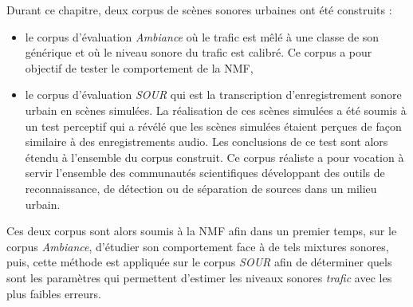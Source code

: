 Durant ce chapitre, deux corpus de scènes sonores urbaines ont été construits :
\begin{itemize}
\item le corpus d'évaluation \textit{Ambiance} où le trafic est mêlé à une classe de son générique et où le niveau sonore du trafic est calibré.  Ce corpus a pour objectif de tester le comportement de la NMF,
\item le corpus d'évaluation \textit{SOUR} qui est la transcription d'enregistrement sonore urbain en scènes simulées. La réalisation de ces scènes simulées a été soumis à un test perceptif qui a révélé que les scènes simulées étaient perçues de façon similaire à des enregistrements audio. Les conclusions de ce test sont alors étendu à l'ensemble du corpus construit. Ce corpus réaliste a pour vocation à servir l'ensemble des communautés scientifiques développant des outils de reconnaissance, de détection ou de séparation de sources dans un milieu urbain. \\
\end{itemize}

Ces deux corpus sont alors soumis à la NMF afin dans un premier temps, sur le corpus \textit{Ambiance}, d'étudier son comportement face à de tels mixtures sonores, puis, cette méthode est appliquée sur le corpus \textit{SOUR} afin de déterminer quels sont les paramètres qui permettent d'estimer les niveaux sonores \textit{trafic} avec les plus faibles erreurs.


%

